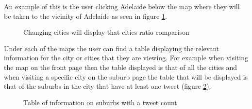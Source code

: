 \documentclass[11pt, oneside]{article}
\begin{document}
An example of this is the user clicking Adelaide below the map where they will be taken to the vicinity of Adelaide as seen in figure \ref{fig:adelaide_suburbs_visualization}.
\newline
\newline
\begin{figure}
  \begin{center}
  \end{center}
  \caption{Changing cities will display that cities ratio comparison}
  \label{fig:adelaide_suburbs_visualization}
\end{figure}
Under each of the maps the user can find a table displaying the relevant information for the city or cities that they are viewing. For example when visiting the map on the front page then the table displayed is that of all the cities and when visiting a specific city on the suburb page the table that will be displayed is that of the suburbs in the city that have at least one tweet (figure \ref{fig:suburb_table}).
\newline
\newline
\begin{figure}
  \begin{center}
  \end{center}
  \caption{Table of information on suburbs with a tweet count}
  \label{fig:suburb_table}
\end{figure}
\end{document}
